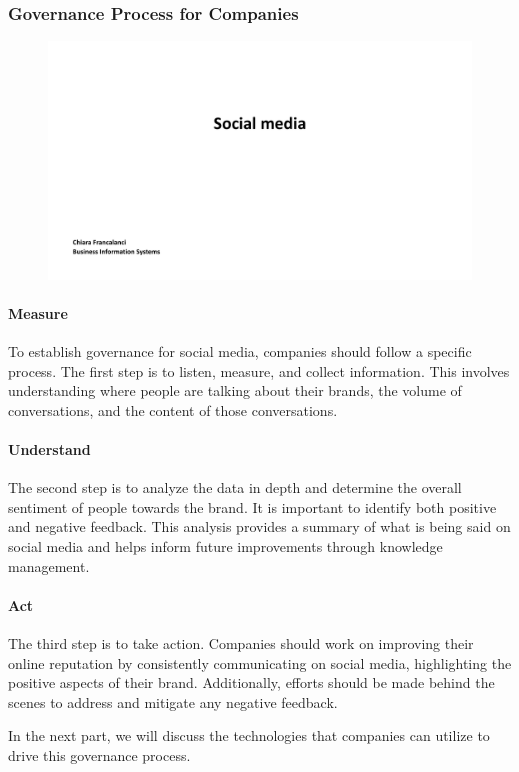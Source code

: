 \subsubsection{Governance Process for
  Companies}\label{governance-process-for-companies}

\begin{figure}[!h]
  \centering
  \includegraphics[page=23, trim = 1cm 2.5cm 4cm 0.5cm, clip, width=\imagewidth]{images/04 - Social_Media.pdf}
\end{figure}

\paragraph{Measure}
To establish governance for social media, companies should follow a
specific process. The first step is to listen, measure, and collect
information. This involves understanding where people are talking about
their brands, the volume of conversations, and the content of those
conversations.

\paragraph{Understand}
The second step is to analyze the data in depth and
determine the overall sentiment of people towards the brand. It is
important to identify both positive and negative feedback. This analysis
provides a summary of what is being said on social media and helps
inform future improvements through knowledge management.

\paragraph{Act}
The third step is to take action. Companies should work on improving
their online reputation by consistently communicating on social media,
highlighting the positive aspects of their brand. Additionally, efforts
should be made behind the scenes to address and mitigate any negative
feedback.

In the next part, we will discuss the technologies that companies can
utilize to drive this governance process.
